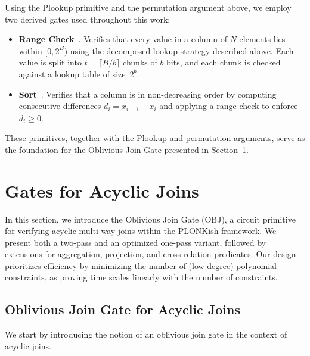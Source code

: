 \documentclass[sigconf]{acmart}
\begin{document}
Using the Plookup primitive and the permutation argument above, we employ two derived gates used throughout this work:

\begin{itemize}[leftmargin=*]
    \item \textbf{Range Check}~\cite{gu2025poneglyphdb, gu2025integrating}.
    Verifies that every value in a column of $N$ elements lies within $[0, 2^B)$ using the decomposed lookup strategy described above. Each value is split into $t = \lceil B/b \rceil$ chunks of $b$ bits, and each chunk is checked against a lookup table of size~$2^b$. 

    \item \textbf{Sort}~\cite{gu2025poneglyphdb}.
    Verifies that a column is in non-decreasing order by computing consecutive differences $d_i = x_{i+1} - x_i$ and applying a range check to enforce $d_i \geq 0$. 
\end{itemize}

These primitives, together with the Plookup and permutation arguments, serve as the foundation for the Oblivious Join Gate presented in Section~\ref{sec:gates}.








\section{Gates for Acyclic Joins}
\label{sec:gates}

In this section, we introduce the Oblivious Join Gate (OBJ), a circuit primitive for verifying acyclic multi-way joins within the PLONKish framework. We present both a two-pass and an optimized one-pass variant, followed by extensions for aggregation, projection, and cross-relation predicates. Our design prioritizes efficiency by minimizing the number of (low-degree) polynomial constraints, as proving time scales linearly with the number of constraints.

\subsection{Oblivious Join Gate for Acyclic Joins }
We start by introducing the notion of an oblivious join gate in the context of acyclic joins.
\end{document}
